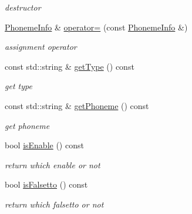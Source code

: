 \begin{DoxyCompactItemize}
\begin{DoxyCompactList}\small\item\em destructor \end{DoxyCompactList}\item 
\hypertarget{classsinsy_1_1PhonemeInfo_ad1a23198e02897ab36e0bc66e652c59d}{\hyperlink{classsinsy_1_1PhonemeInfo}{\-Phoneme\-Info} \& \hyperlink{classsinsy_1_1PhonemeInfo_ad1a23198e02897ab36e0bc66e652c59d}{operator=} (const \hyperlink{classsinsy_1_1PhonemeInfo}{\-Phoneme\-Info} \&)}\label{classsinsy_1_1PhonemeInfo_ad1a23198e02897ab36e0bc66e652c59d}

\begin{DoxyCompactList}\small\item\em assignment operator \end{DoxyCompactList}\item 
\hypertarget{classsinsy_1_1PhonemeInfo_a47fc88b631936e6c69255e46153ce590}{const std\-::string \& \hyperlink{classsinsy_1_1PhonemeInfo_a47fc88b631936e6c69255e46153ce590}{get\-Type} () const }\label{classsinsy_1_1PhonemeInfo_a47fc88b631936e6c69255e46153ce590}

\begin{DoxyCompactList}\small\item\em get type \end{DoxyCompactList}\item 
\hypertarget{classsinsy_1_1PhonemeInfo_ae93f72978ddfd335b28530143014f1c5}{const std\-::string \& \hyperlink{classsinsy_1_1PhonemeInfo_ae93f72978ddfd335b28530143014f1c5}{get\-Phoneme} () const }\label{classsinsy_1_1PhonemeInfo_ae93f72978ddfd335b28530143014f1c5}

\begin{DoxyCompactList}\small\item\em get phoneme \end{DoxyCompactList}\item 
\hypertarget{classsinsy_1_1PhonemeInfo_a3bd37ae7feb6f2646f71a0cafa81722c}{bool \hyperlink{classsinsy_1_1PhonemeInfo_a3bd37ae7feb6f2646f71a0cafa81722c}{is\-Enable} () const }\label{classsinsy_1_1PhonemeInfo_a3bd37ae7feb6f2646f71a0cafa81722c}

\begin{DoxyCompactList}\small\item\em return which enable or not \end{DoxyCompactList}\item 
\hypertarget{classsinsy_1_1PhonemeInfo_a8663710459dd3f5bc6eeee71ca658d73}{bool \hyperlink{classsinsy_1_1PhonemeInfo_a8663710459dd3f5bc6eeee71ca658d73}{is\-Falsetto} () const }\label{classsinsy_1_1PhonemeInfo_a8663710459dd3f5bc6eeee71ca658d73}

\begin{DoxyCompactList}\small\item\em return which falsetto or not \end{DoxyCompactList}\end{DoxyCompactItemize}
